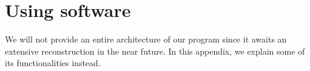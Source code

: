 \chapter{Using software}

We will not provide an entire architecture of our program since it awaits an extensive reconstruction in the near future. In this appendix, we explain some of its functionalities instead.

\begin{comment}

\section{Python script}
\label{sec:code}

This appendix intends to explain to the reader how to use the python script. The program starts by running the \verb|main.py| file. In this file there are definition of function which uses more complex functionalities from the other modules. When running the \verb|main.py| one should uncomment all the lines he/she want to be executed (see \ref{lst:main}).

\xxx{This is an example code.}

\begin{Verbatim}
def StepVerlet(ODESystem, rv, t, dt, aCoulomb, mass, charge, trapParams):

    r, v = rv
    v, a = ODESystem(rv, t, aCoulomb, mass, charge, trapParams)
    
    r1 = r + v * dt + 0.5 * a * dt**2
    
    a1 = ODESystem(np.array([r1, v]), t, aCoulomb, mass, charge, trapParams)[1]    
    
    v1 = v + 0.5 * (a + a1) * dt
    t1 = t + dt
    
    rv1 = np.array([r1, v1])
    
    return rv1, t1   
\end{Verbatim}


\begin{listing}
\begin{lstlisting}
if __name__ == '__main__':
    
    prayForItToWork()
	    
\end{lstlisting}
\caption{Main program.}
\label{lst:main}
\end{listing}


\begin{listing}[H]
\begin{lstlisting}
	def ODESystemEffectiveDamping(rv, aCoulomb, mass, charge, trapParams):


\end{comment}
